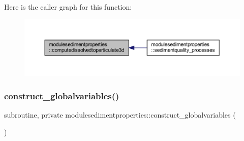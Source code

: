 Here is the caller graph for this function\+:\nopagebreak
\begin{figure}[H]
\begin{center}
\leavevmode
\includegraphics[width=350pt]{namespacemodulesedimentproperties_ad4fd225155211238920de3285f222390_icgraph}
\end{center}
\end{figure}
\mbox{\label{namespacemodulesedimentproperties_ac04693b92d1ed98577124026a0fb1d2e}} 
\subsubsection{\texorpdfstring{construct\+\_\+globalvariables()}{construct\_globalvariables()}}
{\footnotesize\ttfamily subroutine, private modulesedimentproperties\+::construct\+\_\+globalvariables (\begin{DoxyParamCaption}{ }\end{DoxyParamCaption})\hspace{0.3cm}{\ttfamily [private]}}

